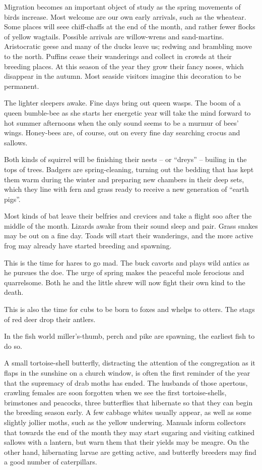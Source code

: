 Migration becomes an important object of study as the spring movements of birds increase. Most welcome are our own early arrivals, such as the wheatear. Some places will seee chiff-chaffs at the end of the month, and rather fewer flocks of yellow wagtails. Possible arrivals are willow-wrens and sand-martins. Aristocratic geese and many of the ducks leave us; redwing and brambling move to the north. Puffins cease their wanderings and collect in crowds at their breeding places. At this season of the year they grow their fancy noses, which disappear in the autumn. Most seaside visitors imagine this decoration to be permanent.

The lighter sleepers awake. Fine days bring out queen wasps. The boom of a queen bumble-bee as she starts her energetic year will take the mind forward to hot summer afternoons when the only sound seems to be a murmur of bees' wings. Honey-bees are, of course, out on every fine day searching crocus and sallows.

Both kinds of squirrel will be finishing their nests -- or ``dreys'' -- builing in the tops of trees. Badgers are spring-cleaning, turning out the bedding that has kept them warm during the winter and preparing new chambers in their deep sets, which they line with fern and grass ready to receive a new generation of ``earth pigs''.

Most kinds of bat leave their belfries and crevices and take a flight soo after the middle of the month. Lizards awake from their sound sleep and pair. Grass snakes may be out on a fine day. Toads will start their wanderings, and the more active frog may already have started breeding and spawning.

This is the time for hares to go mad. The buck cavorts and plays wild antics as he pursues the doe. The urge of spring makes the peaceful mole ferocious and quarrelsome. Both he and the little shrew will now fight their own kind to the death.

This is also the time for cubs to be born to foxes and whelps to otters. The stags of red deer drop their antlers.

In the fish world miller's-thumb, perch and pike are spawning, the earliest fish to do so.

A small tortoise-shell butterfly, distracting the attention of the congregation as it flaps in the sunshine on a church window, is often the first reminder of the year that the supremacy of drab moths has ended. The husbands of those apertous, crawling females are soon forgotten when we see the first tortoise-shells, brimstones and peacocks, three butterflies that hibernate so that they can begin the breeding season early. A few cabbage whites usually appear, as well as some slightly jollier moths, such as the yellow underwing. Manuals inform collectors that towards the end of the month they may start sugaring and visiting catkined sallows with a lantern, but warn them that their yields may be meagre. On the other hand, hibernating larvae are getting active, and butterfly breeders may find a good number of caterpillars.
